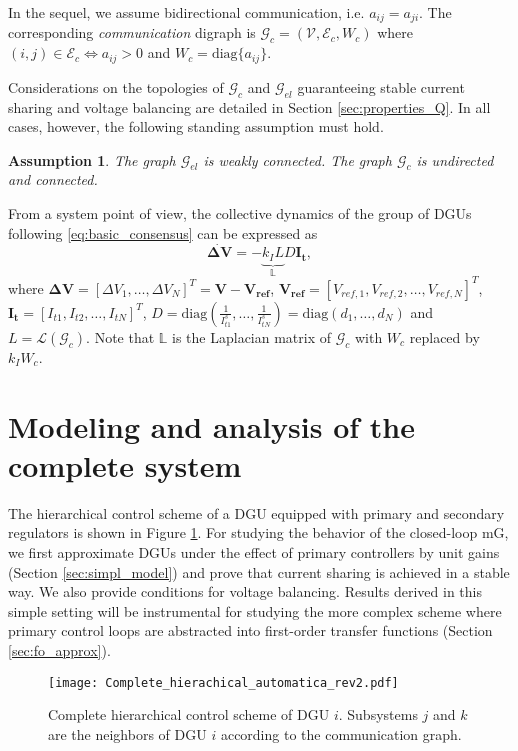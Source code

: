 \documentclass[a4paper]{article}
\theoremstyle{plain}
\newtheorem{ass}{Assumption}
\begin{document}
In the sequel, we assume bidirectional communication, i.e. $a_{ij} =
a_{ji}$. The corresponding \textit{communication} digraph is
$\mathcal{G}_c=(\mathcal{V}, \mathcal{E}_c, W_c)$ where
$(i,j)\in\mathcal{E}_{c}\Longleftrightarrow a_{ij}> 0$ and $W_c =\text{diag}\{a_{ij}\}$. 

Considerations on the topologies of $\mathcal{G}_c$ and $\mathcal{G}_{el}$ guaranteeing stable current sharing and voltage balancing are detailed in Section \ref{sec:properties_Q}. In all cases, however, the following standing assumption must hold.
\begin{ass}
	\label{ass:conneced}
The graph $\mathcal{G}_{el}$ is weakly
		connected. The graph $\mathcal{G}_c$ is undirected and connected.
\end{ass}
From a system point of view, the collective dynamics of the group of DGUs
following \eqref{eq:basic_consensus} can be expressed as
\begin{equation}
\label{eq:ss_simpl_1}
\mathbf{\dot{\Delta V}} = -\underbrace{k_IL}_{\mathbb{L}}D\mathbf{I_{t}},
\end{equation}
where $\mathbf{\Delta V} = [\Delta V_1, \dots, \Delta V_N]^T =
\mathbf{V}-\mathbf{V_{ref}}$, $\mathbf{V_{ref}} = [V_{ref,1}, V_{ref,2}, \dots,
V_{ref,N}]^T$, $\mathbf{I_t} =[I_{t1},I_{t2}, \dots,I_{tN}]^T$, $D=\mathrm{diag}\left(\frac{1}{I_{t1}^s}, \dots, \frac{1}{I_{tN}^s}\right) = \mathrm{diag}\left(d_1, \dots, d_N\right)$ and $L  = \mathcal{L}(\mathcal{G}_c)$. Note that $\mathbb{L}$ is the Laplacian matrix of $\mathcal{G}_c$ with $W_c$ replaced by $k_IW_c$.

\section{Modeling and analysis of the complete system}
\label{sec:modeling_and_analysis}
The hierarchical control scheme of a DGU equipped with primary and
secondary regulators is shown in Figure \ref{fig:ctrl_complete}. For
studying the behavior of the closed-loop mG, we first approximate DGUs under the effect of primary controllers by unit
gains (Section \ref{sec:simpl_model}) and prove that current sharing is achieved in a stable way. We also provide conditions for voltage balancing. Results derived in this simple setting will be 
instrumental for studying the more complex scheme where primary
control loops are abstracted into first-order transfer functions
(Section \ref{sec:fo_approx}).  

\begin{figure}
	\centering
	\texttt{[image: Complete\_hierachical\_automatica\_rev2.pdf]}
	\caption{Complete hierarchical control scheme of DGU $i$. Subsystems $j$ and $k$ are the neighbors of DGU $i$ according to the communication graph.}
	\label{fig:ctrl_complete}
\end{figure}
\end{document}
